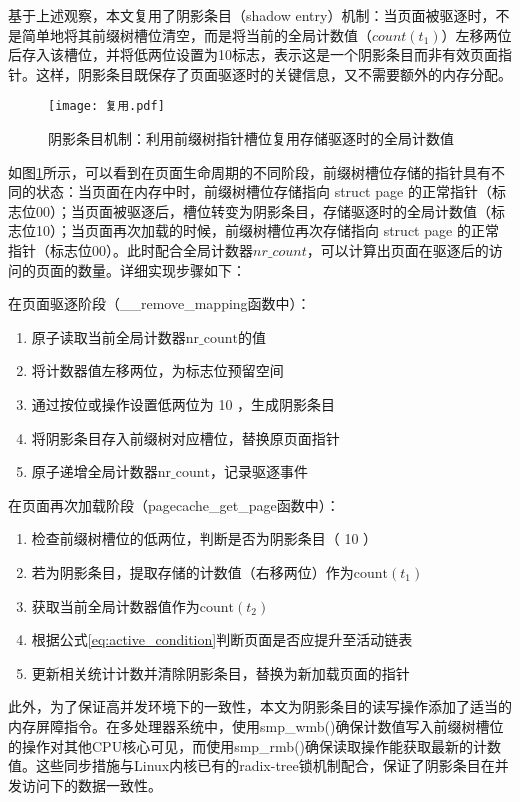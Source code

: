 基于上述观察，本文复用了阴影条目（shadow entry）机制：当页面被驱逐时，不是简单地将其前缀树槽位清空，而是将当前的全局计数值（\(count(t_1)\)）左移两位后存入该槽位，并将低两位设置为10标志，表示这是一个阴影条目而非有效页面指针。这样，阴影条目既保存了页面驱逐时的关键信息，又不需要额外的内存分配。

\begin{figure}[htbp]
  \centering
  \texttt{[image: 复用.pdf]}
  \caption{阴影条目机制：利用前缀树指针槽位复用存储驱逐时的全局计数值}
  \label{fig:复用}
\end{figure}

如图\ref{fig:复用}所示，可以看到在页面生命周期的不同阶段，前缀树槽位存储的指针具有不同的状态：当页面在内存中时，前缀树槽位存储指向 struct page 的正常指针（标志位00）；当页面被驱逐后，槽位转变为阴影条目，存储驱逐时的全局计数值（标志位10）；当页面再次加载的时候，前缀树槽位再次存储指向 struct page 的正常指针（标志位00）。此时配合全局计数器\(nr\_count\)，可以计算出页面在驱逐后的访问的页面的数量。详细实现步骤如下：

在页面驱逐阶段（\_\_remove\_mapping函数中）：
\begin{enumerate}
  \item 原子读取当前全局计数器\(\mathrm{nr\_count}\)的值
  \item 将计数器值左移两位，为标志位预留空间
  \item 通过按位或操作设置低两位为 10 ，生成阴影条目
  \item 将阴影条目存入前缀树对应槽位，替换原页面指针
  \item 原子递增全局计数器\(\mathrm{nr\_count}\)，记录驱逐事件
\end{enumerate}

在页面再次加载阶段（pagecache\_get\_page函数中）：
\begin{enumerate}
  \item 检查前缀树槽位的低两位，判断是否为阴影条目（ 10 ）
  \item 若为阴影条目，提取存储的计数值（右移两位）作为\(\mathrm{count}(t_1)\)
  \item 获取当前全局计数器值作为\(\mathrm{count}(t_2)\)
  \item 根据公式\ref{eq:active_condition}判断页面是否应提升至活动链表
  \item 更新相关统计计数并清除阴影条目，替换为新加载页面的指针
\end{enumerate}

此外，为了保证高并发环境下的一致性，本文为阴影条目的读写操作添加了适当的内存屏障指令。在多处理器系统中，使用smp\_wmb()确保计数值写入前缀树槽位的操作对其他CPU核心可见，而使用smp\_rmb()确保读取操作能获取最新的计数值。这些同步措施与Linux内核已有的radix-tree锁机制配合，保证了阴影条目在并发访问下的数据一致性。

